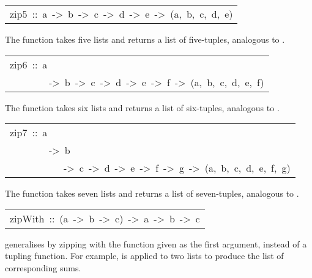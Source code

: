 \begin{haddockdesc}
\item[\begin{tabular}{@{}l}
zip5\ ::\ {\char 91}a{\char 93}\ ->\ {\char 91}b{\char 93}\ ->\ {\char 91}c{\char 93}\ ->\ {\char 91}d{\char 93}\ ->\ {\char 91}e{\char 93}\ ->\ {\char 91}(a,\ b,\ c,\ d,\ e){\char 93}
\end{tabular}]\haddockbegindoc
The  function takes five lists and returns a list of
 five-tuples, analogous to .
\par

\end{haddockdesc}
\begin{haddockdesc}
\item[\begin{tabular}{@{}l}
zip6\ ::\ {\char 91}a{\char 93}\\\ \ \ \ \ \ \ \ ->\ {\char 91}b{\char 93}\ ->\ {\char 91}c{\char 93}\ ->\ {\char 91}d{\char 93}\ ->\ {\char 91}e{\char 93}\ ->\ {\char 91}f{\char 93}\ ->\ {\char 91}(a,\ b,\ c,\ d,\ e,\ f){\char 93}
\end{tabular}]\haddockbegindoc
The  function takes six lists and returns a list of six-tuples,
 analogous to .
\par

\end{haddockdesc}
\begin{haddockdesc}
\item[\begin{tabular}{@{}l}
zip7\ ::\ {\char 91}a{\char 93}\\\ \ \ \ \ \ \ \ ->\ {\char 91}b{\char 93}\\\ \ \ \ \ \ \ \ \ \ \ ->\ {\char 91}c{\char 93}\ ->\ {\char 91}d{\char 93}\ ->\ {\char 91}e{\char 93}\ ->\ {\char 91}f{\char 93}\ ->\ {\char 91}g{\char 93}\ ->\ {\char 91}(a,\ b,\ c,\ d,\ e,\ f,\ g){\char 93}
\end{tabular}]\haddockbegindoc
The  function takes seven lists and returns a list of
 seven-tuples, analogous to .
\par

\end{haddockdesc}
\begin{haddockdesc}
\item[\begin{tabular}{@{}l}
zipWith\ ::\ (a\ ->\ b\ ->\ c)\ ->\ {\char 91}a{\char 93}\ ->\ {\char 91}b{\char 93}\ ->\ {\char 91}c{\char 93}
\end{tabular}]\haddockbegindoc
{} generalises  by zipping with the function given
 as the first argument, instead of a tupling function.
 For example,  is applied to two lists to produce the
 list of corresponding sums.
\par

\end{haddockdesc}
